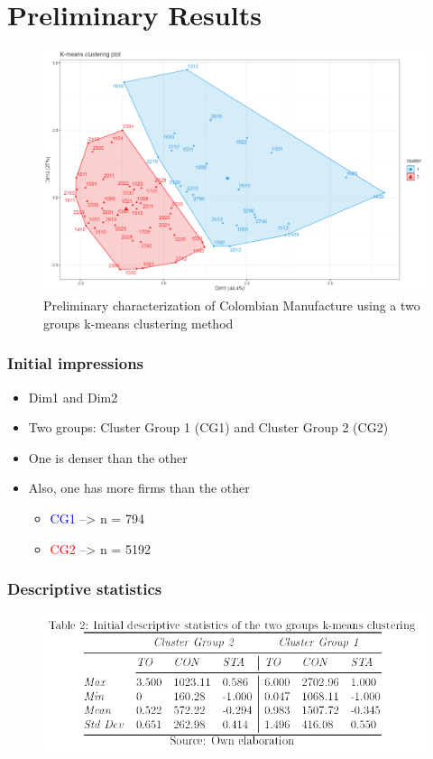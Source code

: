 \documentclass{beamer}
\begin{document}
\section{Preliminary Results}
	\begin{frame}
		 \begin{figure}[H]	
		 	\caption{Preliminary characterization of Colombian Manufacture using a two groups k-means clustering method}
		 	\centering
		 	\includegraphics[scale = 0.29]{cluster.png}
		 \end{figure}
	\end{frame} 
	\begin{frame}
		\frametitle{Initial impressions}
		\begin{itemize}
			\item Dim1 and Dim2
			\item Two groups: Cluster Group 1 (CG1) and Cluster Group 2 (CG2)
			\item One is denser than the other
			\item Also, one has more firms than the other
				\begin{itemize}
					\item \textcolor{blue}{CG1} --> n = 794
					\item \textcolor{red}{CG2}  --> n = 5192
				\end{itemize}
		\end{itemize}
	\end{frame}
	\begin{frame}
		\frametitle{Descriptive statistics}
		\begin{figure}
			\centering
			\includegraphics[scale=0.55]{descsta.png}
		\end{figure}
	\end{frame}
\end{document}
